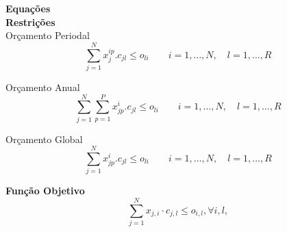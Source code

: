 \documentclass{article}
\newcommand{\topico}[1]{
  \vspace{10pt}
  {\Large \bf #1 }
  \\
}
\begin{document}
\topico{Equações}

\topico{Restrições}

Orçamento Periodal
\begin{equation}
  \sum_{j = 1}^{N} x_j^{ip} . c_{jl} \leq o_{li}
  	\qquad i = 1, \ldots, N ,\quad l = 1, \ldots, R
\end{equation}

Orçamento Anual
\begin{equation}
  \sum_{j = 1}^{N} \sum_{p = 1}^{P} x_{jp}^{i} . c_{jl} \leq o_{li}
  	\qquad i = 1, \ldots, N ,\quad l = 1, \ldots, R
\end{equation}

Orçamento Global
\begin{equation}
  \sum_{j = 1}^{N} x_{jp}^{i} . c_{jl} \leq o_{li}
  	\qquad i = 1, \ldots, N ,\quad l = 1, \ldots, R
\end{equation}

\topico{Função Objetivo}

\begin{equation}
    \sum_{j=1}^{N} x_{j, i} \cdot c_{j,l} \le o_{i,l}, \forall i, l,
  \label{eq:budget}
\end{equation}
\end{document}

